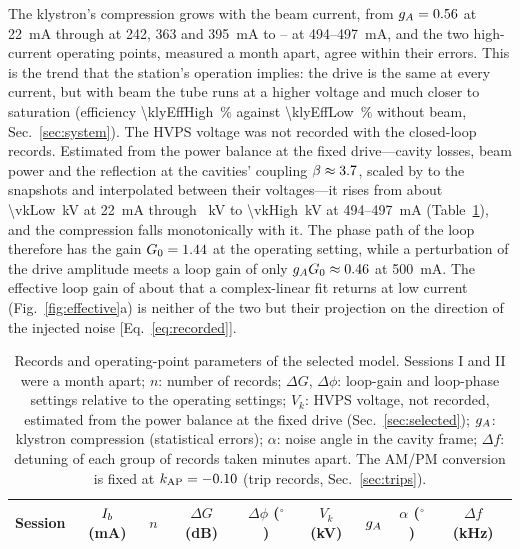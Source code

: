 The klystron's compression grows with the beam current, from $g_A=0.56$ at \SI{22}{mA} through \gaSelMid{} at 242, 363 and \SI{395}{mA} to \gaSelHighLo--\gaSelHighHi{} at \SI{494}{}--\SI{497}{mA}, and the two high-current operating points, measured a month apart, agree within their errors. This is the trend that the station's operation implies: the drive is the same at every current, but with beam the tube runs at a higher voltage and much closer to saturation (efficiency \SI{\klyEffHigh}{\percent} against \SI{\klyEffLow}{\percent} without beam, Sec.~\ref{sec:system}). The HVPS voltage was not recorded with the closed-loop records. Estimated from the power balance at the fixed drive---cavity losses, beam power and the reflection at the cavities' coupling $\beta\approx3.7$, scaled by \pfwdScale{} to the snapshots and interpolated between their voltages---it rises from about \SI{\vkLow}{kV} at \SI{22}{mA} through \vkMid{}~kV to \SI{\vkHigh}{kV} at \SI{494}{}--\SI{497}{mA} (Table~\ref{tab:groups}), and the compression falls monotonically with it. The phase path of the loop therefore has the gain $G_0=1.44$ at the operating setting, while a perturbation of the drive amplitude meets a loop gain of only $g_A G_0\approx0.46$ at \SI{500}{mA}. The effective loop gain of about \effGLow{} that a complex-linear fit returns at low current (Fig.~\ref{fig:effective}a) is neither of the two but their projection on the direction of the injected noise [Eq.~\eqref{eq:recorded}].

\begin{table}[tb]
\caption{Records and operating-point parameters of the selected model. Sessions I and II were a month apart; $n$: number of records; $\Delta G$, $\Delta\phi$: loop-gain and loop-phase settings relative to the operating settings; $V_k$: HVPS voltage, not recorded, estimated from the power balance at the fixed drive (Sec.~\ref{sec:selected}); $g_A$: klystron compression (statistical errors); $\alpha$: noise angle in the cavity frame; $\Delta f$: detuning of each group of records taken minutes apart. The AM/PM conversion is fixed at $k_\mathrm{AP}=-0.10$ (trip records, Sec.~\ref{sec:trips}).}\label{tab:groups}
\begin{ruledtabular}
\begin{tabular}{lcccccccc}
Session & $I_b$ (mA) & $n$ & $\Delta G$ (dB) & $\Delta\phi$ ($^\circ$) & $V_k$ (kV) & $g_A$ & $\alpha$ ($^\circ$) & $\Delta f$ (kHz) \\
\hline

\end{tabular}
\end{ruledtabular}
\end{table}


